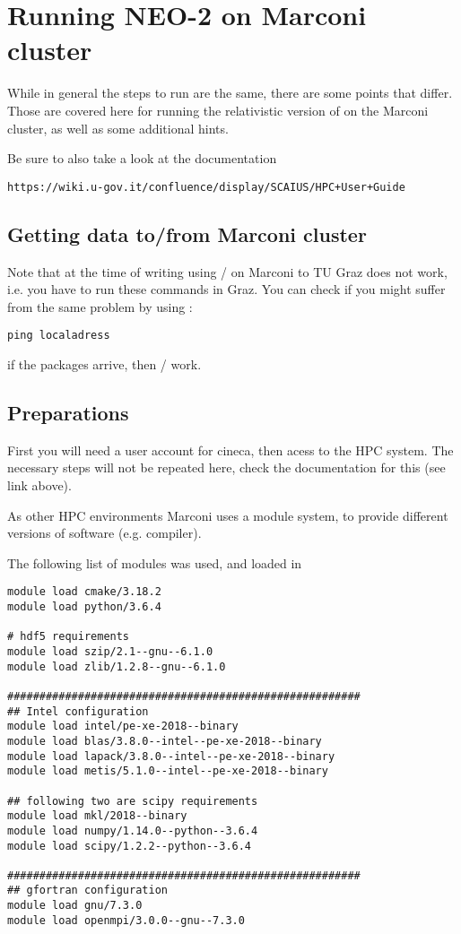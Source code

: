 \documentclass{article}
\newcommand{\vv}[1]{\texttt{\detokenize{#1}}}
\begin{document}
\section{Running NEO-2 on Marconi cluster\label{marconi}}
While in general the steps to run \vv{NEO-2} are the same, there are
some points that differ. Those are covered here for running the relativistic version of \vv{NEO-2}
on the Marconi cluster, as well as some additional hints.

Be sure to also take a look at the documentation
\begin{verbatim}
https://wiki.u-gov.it/confluence/display/SCAIUS/HPC+User+Guide
\end{verbatim}

\subsection{Getting data to/from Marconi cluster}
Note that at the time of writing using \vv{scp}/\vv{rsync} on Marconi to
TU Graz does not work, i.e. you have to run these commands in Graz.
You can check if you might suffer from the same problem by using \vv{ping}:
\begin{verbatim}
ping localadress
\end{verbatim}
if the packages arrive, then \vv{scp}/\vv{rsync} work.

\subsection{Preparations}
First you will need a user account for cineca, then acess to the HPC
system. The necessary steps will not be repeated here, check the
documentation for this (see link above).

As other HPC environments Marconi uses a module system, to provide
different versions of software (e.g. compiler).

The following list of modules was used, and loaded in \vv{.bashrc}

\begin{verbatim}
module load cmake/3.18.2
module load python/3.6.4

# hdf5 requirements
module load szip/2.1--gnu--6.1.0
module load zlib/1.2.8--gnu--6.1.0

#######################################################
## Intel configuration
module load intel/pe-xe-2018--binary
module load blas/3.8.0--intel--pe-xe-2018--binary
module load lapack/3.8.0--intel--pe-xe-2018--binary
module load metis/5.1.0--intel--pe-xe-2018--binary

## following two are scipy requirements
module load mkl/2018--binary
module load numpy/1.14.0--python--3.6.4
module load scipy/1.2.2--python--3.6.4

#######################################################
## gfortran configuration
module load gnu/7.3.0
module load openmpi/3.0.0--gnu--7.3.0
\end{verbatim}
\end{document}
